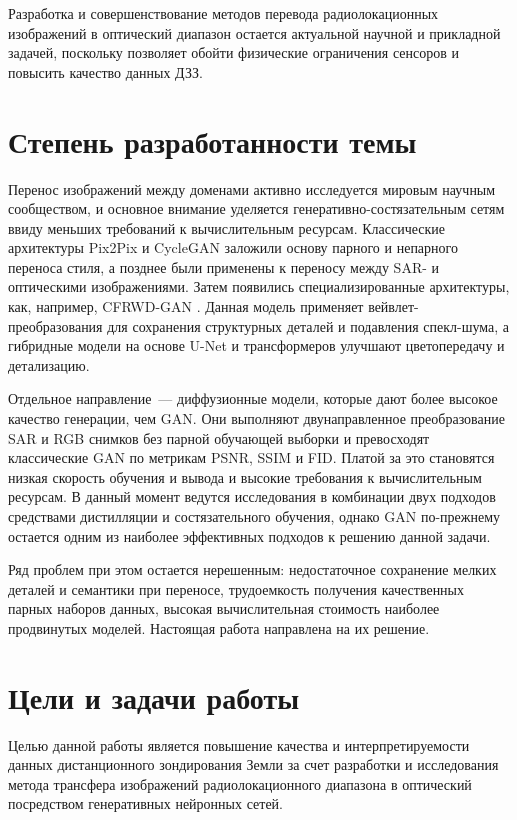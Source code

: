 Разработка и совершенствование методов перевода радиолокационных изображений в оптический диапазон остается актуальной научной и прикладной задачей, поскольку позволяет обойти физические ограничения сенсоров и повысить качество данных ДЗЗ.

\section{Степень разработанности темы}
Перенос изображений между доменами активно исследуется мировым научным сообществом, и основное внимание уделяется генеративно-состязательным сетям ввиду меньших требований к вычислительным ресурсам.
Классические архитектуры Pix2Pix \cite{isola2017image} и CycleGAN \cite{zhu2017unpaired} заложили основу парного и непарного переноса стиля, а позднее были применены к переносу между SAR- и оптическими изображениями.
Затем появились специализированные архитектуры, как, например, CFRWD-GAN \cite{wei2023cfrwd}.
Данная модель применяет вейвлет-преобразования для сохранения структурных деталей и подавления спекл-шума, а гибридные модели на основе U-Net и трансформеров улучшают цветопередачу и детализацию.

Отдельное направление~--- диффузионные модели, которые дают более высокое качество генерации, чем GAN.
Они выполняют двунаправленное преобразование SAR и RGB снимков без парной обучающей выборки и превосходят классические GAN по метрикам PSNR, SSIM и FID.
Платой за это становятся низкая скорость обучения и вывода и высокие требования к вычислительным ресурсам.
В данный момент ведутся исследования в комбинации двух подходов средствами дистилляции и состязательного обучения, однако GAN по-прежнему остается одним из наиболее эффективных подходов к решению данной задачи.

Ряд проблем при этом остается нерешенным: недостаточное сохранение мелких деталей и семантики при переносе, трудоемкость получения качественных парных наборов данных, высокая вычислительная стоимость наиболее продвинутых моделей.
Настоящая работа направлена на их решение.

\section{Цели и задачи работы}
Целью данной работы является повышение качества и интерпретируемости данных дистанционного зондирования Земли за счет разработки и исследования метода трансфера изображений радиолокационного диапазона в оптический посредством генеративных нейронных сетей.

